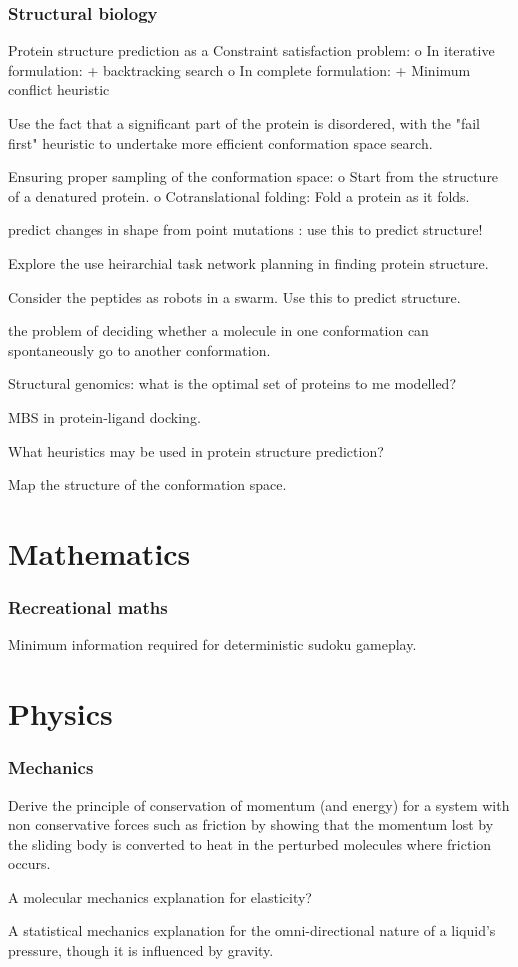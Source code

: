 \documentclass{article}
\begin{document}
\section{Structural biology}
Protein structure prediction as a Constraint satisfaction problem:
          o In iterative formulation:
                + backtracking search
          o In complete formulation:
                + Minimum conflict heuristic

Use the fact that a significant part of the protein is disordered, with the "fail first" heuristic to undertake more efficient conformation space search.

Ensuring proper sampling of the conformation space:
          o Start from the structure of a denatured protein.
          o Cotranslational folding: Fold a protein as it folds.

predict changes in shape from point mutations : use this to predict structure!

Explore the use heirarchial task network planning in finding protein structure.

Consider the peptides as robots in a swarm. Use this to predict structure.

the problem of deciding whether a molecule in one conformation can spontaneously go to another conformation.

Structural genomics: what is the optimal set of proteins to me modelled?

MBS in protein-ligand docking.

What heuristics may be used in protein structure prediction?

Map the structure of the conformation space.

\part{Mathematics}
\section{Recreational maths}


Minimum information required for deterministic sudoku gameplay.

\part{Physics}
\section{Mechanics}



Derive the principle of conservation of momentum (and energy) for a system with non conservative forces such as friction by showing that the momentum lost by the sliding body is converted to heat in the perturbed molecules where friction occurs.


A molecular mechanics explanation for elasticity?


A statistical mechanics explanation for the omni-directional nature of a liquid's pressure, though it is influenced by gravity.




% 
% 
\end{document}
